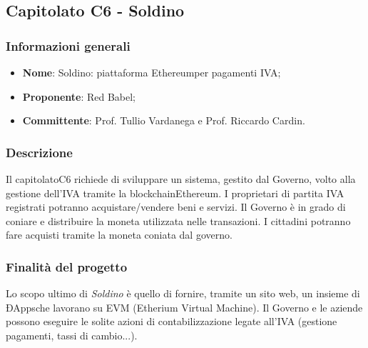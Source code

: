 \subsection{Capitolato C6 - Soldino}

\subsubsection{Informazioni generali}
\begin{itemize}
	\item \textbf {Nome}: Soldino: piattaforma Ethereum\glosp per pagamenti IVA;
	\item \textbf {Proponente}: Red Babel;
	\item \textbf {Committente}: Prof. Tullio Vardanega e Prof. Riccardo Cardin.
\end{itemize}

\subsubsection{Descrizione}
Il capitolato\glosp C6 richiede di sviluppare un sistema, gestito dal Governo, volto alla gestione dell'IVA tramite la blockchain\glosp Ethereum\glo. I proprietari di partita IVA registrati potranno acquistare/vendere beni e servizi.
Il Governo è in grado di coniare e distribuire la moneta utilizzata nelle transazioni. I cittadini potranno fare acquisti tramite la moneta coniata dal governo.   

\subsubsection{Finalità del progetto}
Lo scopo ultimo di \textit{Soldino} è quello di fornire, tramite un sito web, un insieme di ÐApps\glosp che lavorano su EVM (Etherium Virtual Machine). Il Governo e le aziende possono eseguire le solite azioni di contabilizzazione legate all'IVA (gestione pagamenti, tassi di cambio...).  
